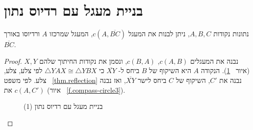 
\section{בניית מעגל עם רדיוס נתון}\label{s.circle}

\begin{theorem}\label{thm.radius}
נתונות נקודות
$A,B,C$,
ניתן לבנות את המעגל
$c(A,\overline{BC})$,
המעגל שמרכזו 
$A$
ורדיוסו באורך 
$\overline{BC}$.
\end{theorem}
\begin{proof}
נבנה את המעגלים 
$c(A,B)$, $c(B,A)$,
ונסמן את נקודות החיתוך שלהם
$X,Y$
(איור%
~\ref{f.compass-circle1}).
הנקודה
$A$
היא השיקוף של 
$B$
ביחס ל- 
$\overline{XY}$
כי
$\triangle YAX\cong \triangle YBX$
לפי צלע, צלע, צלע. לפי משפט%
~\ref{thm.reflection}
נבנה את
$C'$,
השיקוף של
$C$
ביחס לישר
$\overline{XY}$,
ואז נבנה את
$c(A,C')$
(איור%
~\ref{f.compass-circle3}).
\begin{figure}[tb]
\begin{center}
\end{center}
\caption{בניית מעגל עם רדיוס נתון (1)}\label{f.compass-circle1}
\end{figure}


\end{proof}
